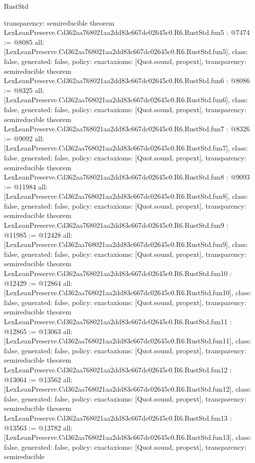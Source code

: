 \begin{lexlean}{RustStd}
\begin{coremodule}
{  transparency: semireducible
}
theorem LexLeanPreserve.Cd362aa768021aa2dd83c667dc02645c0.R6.RustStd.fun5 : @7474 := @8085 {
  all: [LexLeanPreserve.Cd362aa768021aa2dd83c667dc02645c0.R6.RustStd.fun5],
  class: false,
  generated: false,
  policy: exact{axioms: [Quot.sound, propext]},
  transparency: semireducible
}
theorem LexLeanPreserve.Cd362aa768021aa2dd83c667dc02645c0.R6.RustStd.fun6 : @8086 := @8325 {
  all: [LexLeanPreserve.Cd362aa768021aa2dd83c667dc02645c0.R6.RustStd.fun6],
  class: false,
  generated: false,
  policy: exact{axioms: [Quot.sound, propext]},
  transparency: semireducible
}
theorem LexLeanPreserve.Cd362aa768021aa2dd83c667dc02645c0.R6.RustStd.fun7 : @8326 := @9092 {
  all: [LexLeanPreserve.Cd362aa768021aa2dd83c667dc02645c0.R6.RustStd.fun7],
  class: false,
  generated: false,
  policy: exact{axioms: [Quot.sound, propext]},
  transparency: semireducible
}
theorem LexLeanPreserve.Cd362aa768021aa2dd83c667dc02645c0.R6.RustStd.fun8 : @9093 := @11984 {
  all: [LexLeanPreserve.Cd362aa768021aa2dd83c667dc02645c0.R6.RustStd.fun8],
  class: false,
  generated: false,
  policy: exact{axioms: [Quot.sound, propext]},
  transparency: semireducible
}
theorem LexLeanPreserve.Cd362aa768021aa2dd83c667dc02645c0.R6.RustStd.fun9 : @11985 := @12428 {
  all: [LexLeanPreserve.Cd362aa768021aa2dd83c667dc02645c0.R6.RustStd.fun9],
  class: false,
  generated: false,
  policy: exact{axioms: [Quot.sound, propext]},
  transparency: semireducible
}
theorem LexLeanPreserve.Cd362aa768021aa2dd83c667dc02645c0.R6.RustStd.fun10 : @12429 := @12864 {
  all: [LexLeanPreserve.Cd362aa768021aa2dd83c667dc02645c0.R6.RustStd.fun10],
  class: false,
  generated: false,
  policy: exact{axioms: [Quot.sound, propext]},
  transparency: semireducible
}
theorem LexLeanPreserve.Cd362aa768021aa2dd83c667dc02645c0.R6.RustStd.fun11 : @12865 := @13063 {
  all: [LexLeanPreserve.Cd362aa768021aa2dd83c667dc02645c0.R6.RustStd.fun11],
  class: false,
  generated: false,
  policy: exact{axioms: [Quot.sound, propext]},
  transparency: semireducible
}
theorem LexLeanPreserve.Cd362aa768021aa2dd83c667dc02645c0.R6.RustStd.fun12 : @13064 := @13562 {
  all: [LexLeanPreserve.Cd362aa768021aa2dd83c667dc02645c0.R6.RustStd.fun12],
  class: false,
  generated: false,
  policy: exact{axioms: [Quot.sound, propext]},
  transparency: semireducible
}
theorem LexLeanPreserve.Cd362aa768021aa2dd83c667dc02645c0.R6.RustStd.fun13 : @13563 := @13782 {
  all: [LexLeanPreserve.Cd362aa768021aa2dd83c667dc02645c0.R6.RustStd.fun13],
  class: false,
  generated: false,
  policy: exact{axioms: [Quot.sound, propext]},
  transparency: semireducible
}
\end{coremodule}
\end{lexlean}
